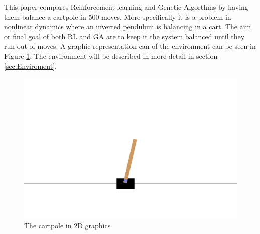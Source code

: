 This paper compares Reinforcement learning and Genetic Algorthms by having them balance a cartpole in 500 moves. More specifically it is a problem in nonlinear dynamics where an inverted pendulum is balancing in a cart. The aim or final goal of both RL and GA are to keep it the system balanced until they run out of moves. A graphic representation can of the environment can be seen in Figure \ref{figPOLE}. The environment will be described in more detail in section \ref{sec:Enviroment}.  
\begin{figure}[H]
    \centering
    \includegraphics [scale = 0.18]{Images/cartpole.png}
    \caption{The cartpole in 2D graphics}
    \label{figPOLE}
\end{figure}


